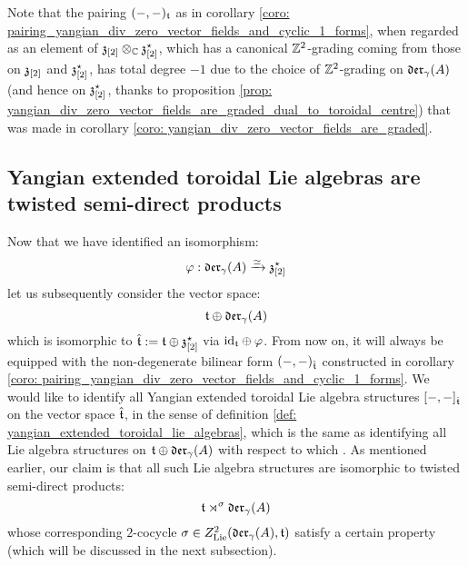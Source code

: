         \begin{remark}
            Note that the pairing $(-, -)_{\mathfrak{t}}$ as in corollary \ref{coro: pairing_yangian_div_zero_vector_fields_and_cyclic_1_forms}, when regarded as an element of $\z_{[2]} \tensor_{\bbC} \z_{[2]}^{\star}$, which has a canonical $\mathbb{Z}^2$-grading coming from those on $\mathfrak{z}_{[2]}$ and $\mathfrak{z}_{[2]}^{\star}$, has total degree $-1$ due to the choice of $\mathbb{Z}^2$-grading on $\mathfrak{der}_{\gamma}(A)$ (and hence on $\mathfrak{z}_{[2]}^{\star}$, thanks to proposition \ref{prop: yangian_div_zero_vector_fields_are_graded_dual_to_toroidal_centre}) that was made in corollary \ref{coro: yangian_div_zero_vector_fields_are_graded}.
        \end{remark}

    \subsection{Yangian extended toroidal Lie algebras are twisted semi-direct products}
        Now that we have identified an isomorphism:
            $$\varphi: \mathfrak{der}_{\gamma}(A) \xrightarrow[]{\simeq} \mathfrak{z}_{[2]}^{\star}$$
        let us subsequently consider the vector space:
            $$\mathfrak{t} \oplus \mathfrak{der}_{\gamma}(A)$$
        which is isomorphic to $\hat{\mathfrak{t}} := \mathfrak{t} \oplus \mathfrak{z}_{[2]}^{\star}$ via $\mathrm{id}_{\mathfrak{t}} \oplus \varphi$. From now on, it will always be equipped with the non-degenerate bilinear form $(-, -)_{\hat{\mathfrak{t}}}$ constructed in corollary \ref{coro: pairing_yangian_div_zero_vector_fields_and_cyclic_1_forms}. We would like to identify all Yangian extended toroidal Lie algebra structures $[-, -]_{\hat{\mathfrak{t}}}$ on the vector space $\hat{\mathfrak{t}}$, in the sense of definition \ref{def: yangian_extended_toroidal_lie_algebras}, which is the same as identifying all Lie algebra structures on $\mathfrak{t} \oplus \mathfrak{der}_{\gamma}(A)$ with respect to which . As mentioned earlier, our claim is that all such Lie algebra structures are isomorphic to twisted semi-direct products:
            $$\mathfrak{t} \rtimes^{\sigma} \mathfrak{der}_{\gamma}(A)$$
        whose corresponding $2$-cocycle $\sigma \in Z^2_{\mathrm{Lie}}(\mathfrak{der}_{\gamma}(A), \mathfrak{t})$ satisfy a certain property (which will be discussed in the next subsection).

